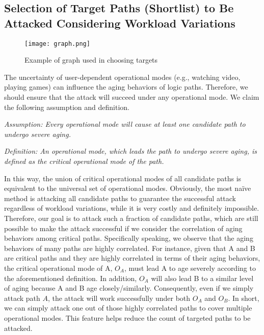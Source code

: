 \subsection{Selection of Target Paths (Shortlist) to Be Attacked Considering Workload Variations}
\label{sec:frame:workload}
\begin{figure}
	\centering
	\texttt{[image: graph.png]}
	\caption{Example of graph used in choosing targets}
	\label{fig:graph}
\end{figure}

The uncertainty of user-dependent operational modes (e.g., watching video, playing games) can influence the aging behaviors of logic paths. Therefore, we should ensure that the attack will succeed under any operational mode. We claim the following assumption and definition.%

{\setlength{\parskip}{3pt}
\noindent \textit{Assumption: Every operational mode will cause at least one candidate path to undergo severe aging.}


\noindent \textit{Definition: An operational mode, which leads the path to undergo severe aging, is defined as the critical operational mode of the path.}
}

In this way, the union of critical operational modes of all candidate paths is equivalent to the universal set of operational modes. Obviously, the most na\"ive method is attacking all candidate paths to guarantee the successful attack regardless of workload variations, while it is very costly and definitely impossible. Therefore, our goal is to attack such a fraction of candidate paths, which are still possible to make the attack successful if we consider the correlation of aging behaviors among critical paths. Specifically speaking, we observe that the aging behaviors of many paths are highly correlated. For instance, given that A and B are critical paths and they are highly correlated in terms of their aging behaviors, the critical operational mode of A, $O_{A}$, must lead A to age severely according to the aforementioned definition. In addition, $O_{A}$ will also lead B to a similar level of aging because A and B age closely/similarly. Consequently, even if we simply attack path $A$, the attack will work successfully under both $O_{A}$ and $O_{B}$. In short, we can simply attack one out of those highly correlated paths to cover multiple operational modes. This feature helps reduce the count of targeted paths to be attacked.

